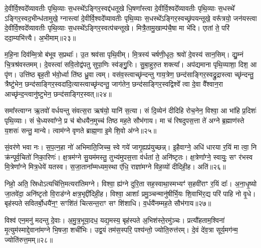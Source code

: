 दे॒वीर्वि॒श्वदे᳚व्यावतीः पृथि॒व्याः स॒धस्थे᳚\-ऽङ्गिर॒स्वद्द॑धतूखे धि॒षणा᳚स्त्वा दे॒वीर्वि॒श्वदे᳚व्यावतीः पृथि॒व्याः स॒धस्थे᳚ \-ऽङ्गिर॒स्वद॒भीन्ध॑तामुखे॒ ग्नास्त्वा॑ दे॒वीर्वि॒श्वदे᳚व्यावतीः पृथि॒व्याः स॒धस्थे᳚\-ऽङ्गिर॒स्वच्छ्र॑पयन्तूखे॒ वरू᳚त्रयो॒ जन॑यस्त्वा दे॒वीर्वि॒श्वदे᳚व्यावतीः पृथि॒व्याः स॒धस्थे᳚\-ऽङ्गिर॒स्वत्प॑चन्तूखे। मित्रै॒तामु॒खाम्प॑चै॒षा मा भे॑दि। एातां ते॒ परि॑ ददा॒म्यभि॑त्त्यै। अ॒भीमाम्॥२३॥

म॒हि॒ना दिव॑म्मि॒त्रो ब॑भूव स॒प्रथाः᳚। उ॒त श्रव॑सा पृथि॒वीम्। मि॒त्रस्य॑ चर्\mbox{}षणी॒धृतः॒ श्रवो॑ दे॒वस्य॑ सान॒सिम्। द्यु॒म्नं चि॒त्रश्र॑वस्तमम्। दे॒वस्त्वा॑ सवि॒तोद्व॑पतु सुपा॒णिः स्व॑ङ्गु॒॒रिः। सु॒बा॒हुरु॒त शक्त्या᳚। अप॑द्यमाना पृथि॒व्याशा॒ दिश॒ आ पृ॑ण। उत्ति॑ष्ठ बृह॒ती भ॑वो॒र्ध्वा ति॑ष्ठ ध्रु॒वा त्वम्। वस॑व॒स्त्वाच्छृ॑न्दन्तु गाय॒त्रेण॒ छन्द॑साङ्गिर॒स्वद्रु॒द्रास्त्वा च्छृ॑न्दन्तु॒ त्रैष्टु॑भेन॒ छन्द॑साङ्गिर॒स्वदा॑दि॒त्यास्त्वाच्छृ॑न्दन्तु॒ जाग॑तेन॒ छन्द॑साङ्गिर॒स्वद्विश्वे᳚ त्वा दे॒वा वै᳚श्वान॒रा आच्छृ॑न्द॒न्त्वानु॑ष्टुभेन॒ छन्द॑साङ्गिर॒स्वत्॥२४॥

{\anuvakamend[{पत्नी॑रि॒माꣳ रु॒द्रास्त्वाच्छृ॑न्द॒न्त्वेका॒न्नविꣳ॑श॒तिश्च॑॥६॥}]}

समा᳚स्त्वाग्न ऋ॒तवो॑ वर्धयन्तु संवत्स॒रा ऋष॑यो॒ यानि॑ स॒त्या। सं दि॒व्येन॑ दीदिहि रोच॒नेन॒ विश्वा॒ आ भा॑हि प्र॒दिशः॑ पृथि॒व्याः। सं चे॒ध्यस्वा᳚ग्ने॒ प्र च॑ बोधयैन॒मुच्च॑ तिष्ठ मह॒ते सौभ॑गाय। मा च॑ रिषदुपस॒त्ता ते॑ अग्ने ब्र॒ह्माण॑स्ते य॒शसः॑ सन्तु॒ मान्ये। त्वाम॑ग्ने वृणते ब्राह्म॒णा इ॒मे शि॒वो अ॑ग्ने॥२५॥

सं॒वर॑णे भवा नः। स॒प॒त्न॒हा नो॑ अभिमाति॒जिच्च॒ स्वे गये॑ जागृ॒ह्यप्र॑युच्छन्न्। इ॒हैवाग्ने॒ अधि॑ धारया र॒यिं मा त्वा॒ नि क्र॑न्पूर्व॒चितो॑ निका॒रिणः॑। क्ष॒त्रम॑ग्ने सु॒यम॑मस्तु॒ तुभ्य॑मुपस॒त्ता व॑र्धतां ते॒ अनि॑ष्टृतः। क्ष॒त्रेणा᳚ग्ने॒ स्वायुः॒ सꣳ र॑भस्व मि॒त्रेणा᳚ग्ने मित्र॒धेये॑ यतस्व। स॒जा॒ताना᳚म्मध्यम॒स्था ए॑धि॒ राज्ञा॑मग्ने विह॒व्यो॑ दीदिही॒ह। अति॑॥२६॥

निहो॒ अति॒ स्रिधो\-ऽत्यचि॑त्ति॒मत्यरा॑तिमग्ने। विश्वा॒ ह्य॑ग्ने दुरि॒ता सह॒स्वाथा॒स्मभ्यꣳ॑ स॒हवी॑राꣳ र॒यिं दाः᳚। अ॒ना॒धृ॒ष्यो जा॒तवे॑दा॒ अनि॑ष्टृतो वि॒राड॑ग्ने क्षत्र॒भृद्दी॑दिही॒ह। विश्वा॒ आशाः᳚ प्रमु॒ञ्चन्मानु॑षीर्भि॒यः शि॒वाभि॑र॒द्य परि॑ पाहि नो वृ॒धे। बृह॑स्पते सवितर्बो॒धयै॑न॒ꣳ॒ सꣳशि॑तं चित्सन्त॒राꣳ सꣳ शि॑शाधि। व॒र्धयै॑नम्मह॒ते सौभ॑गाय॥२७॥

विश्व॑ एन॒मनु॑ मदन्तु दे॒वाः। अ॒मु॒त्र॒भूया॒दध॒ यद्य॒मस्य॒ बृह॑स्पते अ॒भिश॑स्ते॒रमु॑ञ्चः। प्रत्यौ॑हताम॒श्विना॑ मृ॒त्युम॑स्माद्दे॒वाना॑मग्ने भि॒षजा॒ शची॑भिः। उद्व॒यं तम॑स॒स्परि॒ पश्य॑न्तो॒ ज्योति॒रुत्त॑रम्। दे॒वं दे॑व॒त्रा सूर्य॒मग॑न्म॒ ज्योति॑रुत्त॒मम्॥२८॥

